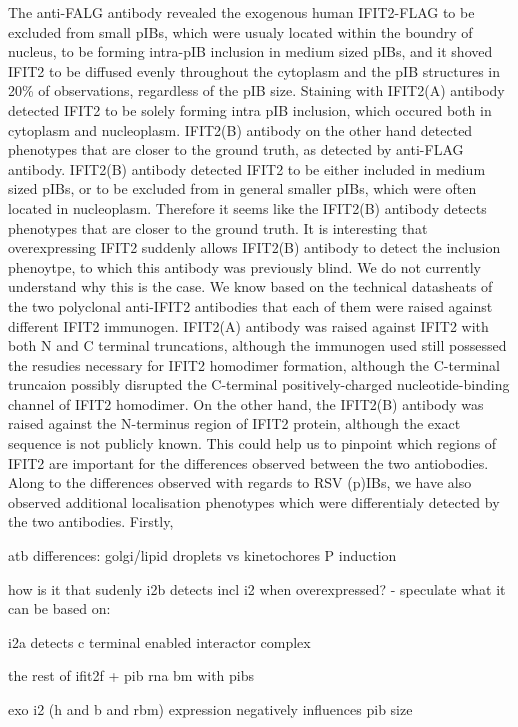 The anti-FALG antibody revealed the exogenous human IFIT2-FLAG to be excluded from small pIBs, which were usualy located within the boundry of nucleus, to be forming intra-pIB inclusion in medium sized pIBs, and it shoved IFIT2 to be diffused evenly throughout the cytoplasm and the pIB structures in 20\% of observations, regardless of the pIB size. Staining with IFIT2(A) antibody detected IFIT2 to be solely forming intra pIB inclusion, which occured both in cytoplasm and nucleoplasm. IFIT2(B) antibody on the other hand detected phenotypes that are closer to the ground truth, as detected by anti-FLAG antibody. IFIT2(B) antibody detected IFIT2 to be either included in medium sized pIBs, or to be excluded from in general smaller pIBs, which were often located in nucleoplasm. Therefore it seems like the IFIT2(B) antibody detects phenotypes that are closer to the ground truth. It is interesting that overexpressing IFIT2 suddenly allows IFIT2(B) antibody to detect the inclusion phenoytpe, to which this antibody was previously blind. We do not currently understand why this is the case. We know based on the technical datasheats of the two polyclonal anti-IFIT2 antibodies that each of them were raised against different IFIT2 immunogen. IFIT2(A) antibody was raised against IFIT2 with both N and C terminal truncations, although the immunogen used still possessed the resudies necessary for IFIT2 homodimer formation, although the C-terminal truncaion possibly disrupted the C-terminal positively-charged nucleotide-binding channel of IFIT2 homodimer. On the other hand, the IFIT2(B) antibody was raised against the N-terminus region of IFIT2 protein, although the exact sequence is not publicly known. This could help us to pinpoint which regions of IFIT2 are important for the differences observed between the two antiobodies. Along to the differences observed with regards to RSV (p)IBs, we have also observed additional localisation phenotypes which were differentialy detected by the two antibodies. Firstly, 

atb differences:
golgi/lipid droplets vs kinetochores
P induction


how is it that sudenly i2b detects incl i2 when overexpressed?
- speculate what it can be based on:


i2a detects c terminal enabled interactor complex


the rest of ifit2f + pib
rna bm with pibs 

exo i2 (h and b and rbm) expression negatively influences pib size

